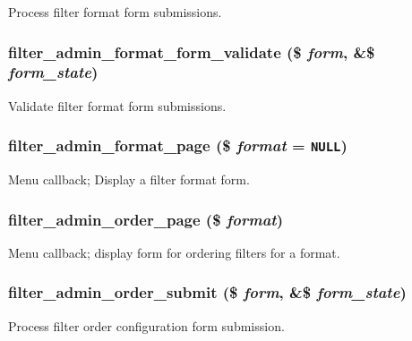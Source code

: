 Process filter format form submissions. \hypertarget{filter_8admin_8inc_1ae5e99340abc69aadeff9d2a538d578}{
\subsubsection[{filter\_\-admin\_\-format\_\-form\_\-validate}]{\setlength{\rightskip}{0pt plus 5cm}filter\_\-admin\_\-format\_\-form\_\-validate (\$ {\em form}, \/  \&\$ {\em form\_\-state})}}
\label{filter_8admin_8inc_1ae5e99340abc69aadeff9d2a538d578}


Validate filter format form submissions. \hypertarget{filter_8admin_8inc_ad02098c7cd9b370e0692fb74f498706}{
\subsubsection[{filter\_\-admin\_\-format\_\-page}]{\setlength{\rightskip}{0pt plus 5cm}filter\_\-admin\_\-format\_\-page (\$ {\em format} = {\tt NULL})}}
\label{filter_8admin_8inc_ad02098c7cd9b370e0692fb74f498706}


Menu callback; Display a filter format form. \hypertarget{filter_8admin_8inc_46f1de68199cbb6be953d33cea19967f}{
\subsubsection[{filter\_\-admin\_\-order\_\-page}]{\setlength{\rightskip}{0pt plus 5cm}filter\_\-admin\_\-order\_\-page (\$ {\em format})}}
\label{filter_8admin_8inc_46f1de68199cbb6be953d33cea19967f}


Menu callback; display form for ordering filters for a format. \hypertarget{filter_8admin_8inc_b784a456f8aaeddc16e19018b80042b0}{
\subsubsection[{filter\_\-admin\_\-order\_\-submit}]{\setlength{\rightskip}{0pt plus 5cm}filter\_\-admin\_\-order\_\-submit (\$ {\em form}, \/  \&\$ {\em form\_\-state})}}
\label{filter_8admin_8inc_b784a456f8aaeddc16e19018b80042b0}


Process filter order configuration form submission. 